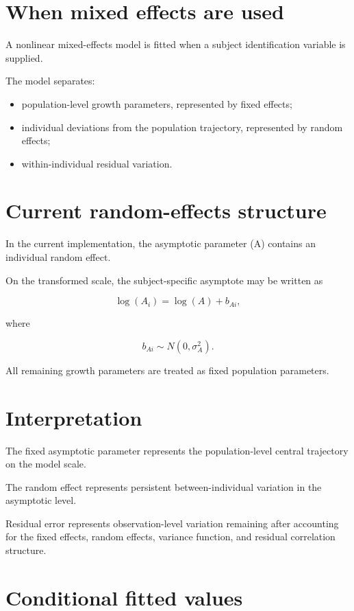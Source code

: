 \documentclass[
  english,
  letterpaper,
  DIV=11,
  numbers=noendperiod]{scrreprt}
\providecommand{\tightlist}{%
  \setlength{\itemsep}{0pt}\setlength{\parskip}{0pt}}
\begin{document}
\section{When mixed effects are used}\label{when-mixed-effects-are-used}

A nonlinear mixed-effects model is fitted when a subject identification
variable is supplied.

The model separates:

\begin{itemize}
\tightlist
\item
  population-level growth parameters, represented by fixed effects;
\item
  individual deviations from the population trajectory, represented by
  random effects;
\item
  within-individual residual variation.
\end{itemize}

\section{Current random-effects
structure}\label{current-random-effects-structure}

In the current implementation, the asymptotic parameter (A) contains an
individual random effect.

On the transformed scale, the subject-specific asymptote may be written
as

\[
\log(A_i) = \log(A) + b_{Ai},
\]

where

\[
b_{Ai} \sim N(0,\sigma_A^2).
\]

All remaining growth parameters are treated as fixed population
parameters.

\section{Interpretation}\label{interpretation}

The fixed asymptotic parameter represents the population-level central
trajectory on the model scale.

The random effect represents persistent between-individual variation in
the asymptotic level.

Residual error represents observation-level variation remaining after
accounting for the fixed effects, random effects, variance function, and
residual correlation structure.

\section{Conditional fitted values}\label{conditional-fitted-values}
\end{document}

